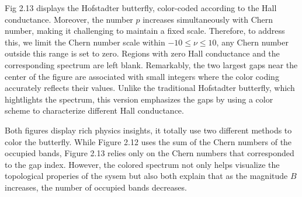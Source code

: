 \documentclass{report}
\begin{document}
Fig 2.13 displays the Hofstadter butterfly, color-coded according to the Hall conductance. Moreover, the number $p$ increases simultaneously with Chern number, making it challenging to maintain a fixed scale. Therefore, to address this, we limit the Chern number scale within $-10 \leq \nu \leq 10$, any Chern number outside this range is set to zero. Regions with zero Hall conductance and the corresponding spectrum are left blank. Remarkably, the two largest gaps near the center of the figure are associated with small integers where the color coding accurately reflects their values. Unlike the traditional Hofstadter butterfly, which hightlights the spectrum, this version emphasizes the gaps by using a color scheme to characterize different Hall conductance.

\newpage

Both figures display rich physics insights, it totally use two different methods to color the butterfly. While Figure 2.12 uses the sum of the Chern numbers of the occupied bands, Figure 2.13 relies only on the Chern numbers that corresponded to the gap index. However, the colored spectrum not only helps visualize the topological properies of the sysem but also both explain that as the magnitude $B$ increases, the number of occupied bands decreases.
\end{document}
